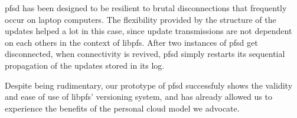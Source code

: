 pfsd has been designed to be resilient to brutal
disconnections that frequently occur on laptop computers. The
flexibility provided by the structure of the updates helped a lot in
this case, since update transmissions are not dependent on each others
in the context of libpfs. After two instances of pfsd get
disconnected, when connectivity is revived, pfsd simply restarts its
sequential propagation of the updates stored in its log.

Despite being rudimentary, our prototype of pfsd successfuly
shows the validity and ease of use of libpfs' versioning system, and
has already allowed us to experience the benefits of the personal
cloud model we advocate.

